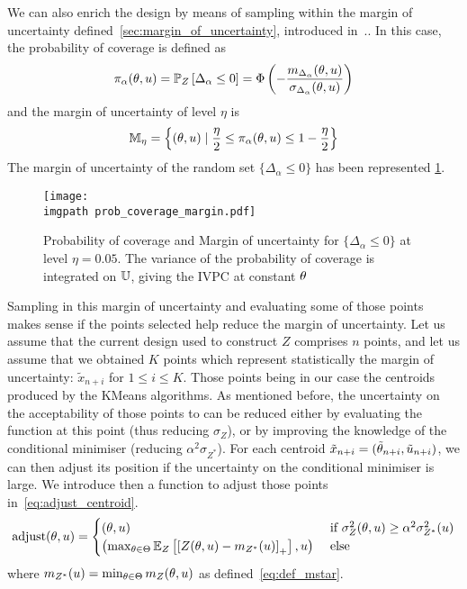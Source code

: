 \documentclass[../../Main_ManuscritThese.tex]{subfiles}
\newcommand\imgpath{/home/victor/acadwriting/Manuscrit/Text/Chapter4/img/}
\begin{document}
We can also enrich the design by means of sampling within the margin of uncertainty defined~\cref{sec:margin_of_uncertainty}, introduced in~\cite{echard_ak-mcs_2011,schobi_rare_2017,razaaly_rare_2019}.. In this case, the probability of coverage is defined as
\begin{equation}
  \pi_{\alpha}(\theta, u) = \mathbb{P}_{Z}\left[\Delta_{\alpha} \leq 0\right] = \Phi\left(-\frac{m_{\Delta_\alpha}(\theta, u)}{\sigma_{\Delta_\alpha}(\theta, u)}\right)
\end{equation}
and the margin of uncertainty of level $\eta$ is
\begin{equation}
  \mathbb{M}_{\eta} = \left\{ (\theta, u) \mid \frac{\eta}{2} \leq \pi_{\alpha}(\theta, u) \leq 1 - \frac{\eta}{2}\right\}
\end{equation}
The margin of uncertainty of the random set $\{\Delta_{\alpha} \leq 0\}$ has been represented \cref{fig:prob_coverage_margin}.
\begin{figure}[ht]
  \centering
  \texttt{[image: \\imgpath prob\_coverage\_margin.pdf]}
  \caption{\label{fig:prob_coverage_margin} Probability of coverage and Margin of uncertainty for  $\{\Delta_{\alpha} \leq 0\}$ at level $\eta=0.05$. The variance of the probability of coverage is integrated on $\mathbb{U}$, giving the IVPC at constant $\theta$}
\end{figure}

Sampling in this margin of uncertainty and evaluating some of those points makes sense if the points selected help reduce the margin of uncertainty.
Let us assume that the current design used to construct $Z$ comprises $n$ points, and let us assume that we obtained $K$ points which represent statistically the margin of uncertainty: $\tilde{x}_{n+i}$ for $1\leq i\leq K$. Those points being in our case the centroids produced by the KMeans algorithms.
As mentioned before, the uncertainty on the acceptability of those points to  can be reduced either by evaluating the function at this point (thus reducing $\sigma_Z$), or by improving the knowledge of the conditional minimiser (reducing $\alpha^2 \sigma_{Z^*}$). For each centroid $\tilde{x}_{n+i} = (\tilde{\theta}_{n+i}, \tilde{u}_{n+i})$, we can then adjust its position if the uncertainty on the conditional minimiser is large. We introduce then a function to adjust those points in~\cref{eq:adjust_centroid}.
\begin{equation}
  \label{eq:adjust_centroid}
  \mathrm{adjust}(\theta,u) =
  \begin{cases}
    (\theta, u) & \text{ if }\sigma^2_Z(\theta, u) \geq \alpha^2\sigma^2_{Z^*}(u)\\
    \left(\max_{\theta\in\Theta} \mathbb{E}_Z\left[\left[Z(\theta,u) - m_{{Z^*}}(u)\right]_+ \right], u \right) & \text{ else}
  \end{cases}
\end{equation}
where $m_{{Z^*}}(u) = \min_{\theta\in\Theta} m_Z(\theta, u)$ as defined~\eqref{eq:def_mstar}.
\end{document}
